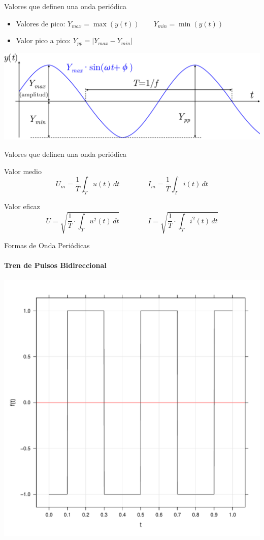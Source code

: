 \documentclass[aspectratio=169, usenames,svgnames,dvipsnames]{beamer}
\begin{document}
\begin{frame}[label={sec:org8087965}]{Valores que definen una onda periódica}
\begin{itemize}
\item Valores de pico: \(Y_{max} = \max(y(t)) \qquad Y_{min} = \min(y(t))\)

\item Valor pico a pico: \(Y_{pp} = |Y_{max} - Y_{min}|\)
\end{itemize}
\begin{center}
\includegraphics[width=.9\linewidth]{../figs/Senoidal_parametros.pdf}
\end{center}
\end{frame}
\begin{frame}[label={sec:org5333373}]{Valores que definen una onda periódica}
\begin{block}{Valor medio}
\[
U_m=\dfrac{1}{T}\int_T u(t)\, dt \qquad \qquad%
I_m=\dfrac{1}{T}\int_T i(t)\, dt
\]
\end{block}
\begin{block}{Valor eficaz}
\[
U = \sqrt{\dfrac{1}{T}\cdot\int_{T} u^{2}(t)\, dt} \qquad \qquad%
I = \sqrt{\dfrac{1}{T}\cdot\int_{T} i^{2}(t)\, dt}
\]
\end{block}
\end{frame}
\begin{frame}[label={sec:org20f9d60}]{Formas de Onda Periódicas}
\framesubtitle{Tren de Pulsos Bidireccional}
\begin{center}
\includegraphics[height=0.9\textheight]{../figs/cuadrada_periodica.pdf}
\end{center}
\end{frame}
\end{document}

